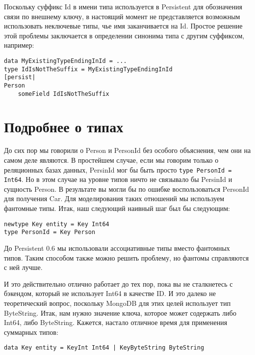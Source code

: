 \begin{remark}
Поскольку суффикс Id в имени типа используется в Persistent для обозначения связи по внешнему ключу, в настоящий момент не представляется возможным использовать неключевые типы, чье имя заканчивается на Id. Простое решение этой проблемы заключается в определении синонима типа с другим суффиксом, например:

\begin{lstlisting}
data MyExistingTypeEndingInId = ...
type IdIsNotTheSuffix = MyExistingTypeEndingInId
[persist|
Person
    someField IdIsNotTheSuffix
\end{lstlisting}%
\end{remark}

\section{Подробнее о типах} %

До сих пор мы говорили о Person и PersonId без особого объяснения, чем они на самом деле являются. В простейшем случае, если мы говорим только о реляционных базах данных, PersinId мог бы быть просто \lstinline'type PersonId = Int64'. Но в этом случае на уровне типов ничто не связывало бы PersinId и сущность Person. В результате вы могли бы по ошибке воспользоваться PersonId для получения Car. Для моделирования таких отношений мы используем фантомные типы. Итак, наш следующий наивный шаг был бы следующим:

\begin{lstlisting}
newtype Key entity = Key Int64
type PersonId = Key Person
\end{lstlisting}

\begin{remark}
До Persistent 0.6 мы использовали ассоциативные типы вместо фантомных типов. Таким способом также можно решить проблему, но фантомы справляются с ней лучше.
\end{remark}

И это действительно отлично работает до тех пор, пока вы не сталкнетесь с бэкендом, который не использует Int64 в качестве ID. И это далеко не теоретический вопрос, поскольку MongoDB для этих целей использует тип ByteString. Итак, нам нужно значение ключа, которое может содержать либо Int64, либо ByteString. Кажется, настало отличное время для применения суммарных типов:

\begin{lstlisting}
data Key entity = KeyInt Int64 | KeyByteString ByteString
\end{lstlisting}

